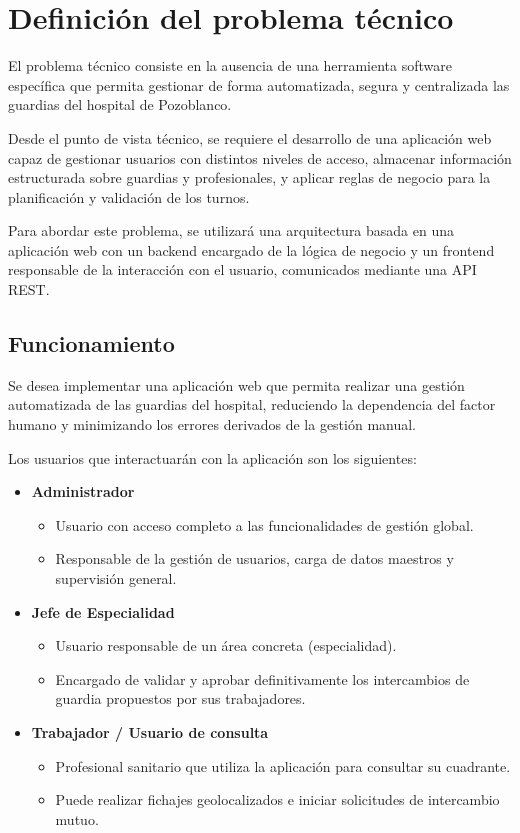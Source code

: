 \section{Definición del problema técnico}

    El problema técnico consiste en la ausencia de una herramienta software específica que permita
    gestionar de forma automatizada, segura y centralizada las guardias del hospital de Pozoblanco.

    Desde el punto de vista técnico, se requiere el desarrollo de una aplicación web capaz de
    gestionar usuarios con distintos niveles de acceso, almacenar información estructurada sobre
    guardias y profesionales, y aplicar reglas de negocio para la planificación y validación de los
    turnos.

    Para abordar este problema, se utilizará una arquitectura basada en una aplicación web con un
    backend encargado de la lógica de negocio y un frontend responsable de la interacción con el
    usuario, comunicados mediante una API REST.

\subsection{Funcionamiento}

    Se desea implementar una aplicación web que permita realizar una gestión automatizada de las
    guardias del hospital, reduciendo la dependencia del factor humano y minimizando los errores
    derivados de la gestión manual.

    Los usuarios que interactuarán con la aplicación son los siguientes:

    \begin{itemize}
    \item \textbf{Administrador}
        \begin{itemize}
        \item Usuario con acceso completo a las funcionalidades de gestión global.
        \item Responsable de la gestión de usuarios, carga de datos maestros y supervisión general.
        \end{itemize}

    \item \textbf{Jefe de Especialidad}
        \begin{itemize}
            \item Usuario responsable de un área concreta (especialidad).
            \item Encargado de validar y aprobar definitivamente los intercambios de guardia propuestos por sus trabajadores.
        \end{itemize}

    \item \textbf{Trabajador / Usuario de consulta}
        \begin{itemize}
            \item Profesional sanitario que utiliza la aplicación para consultar su cuadrante.
            \item Puede realizar fichajes geolocalizados e iniciar solicitudes de intercambio mutuo.
        \end{itemize}
    \end{itemize}
